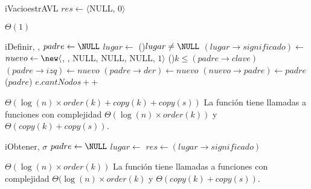 \begin{Algoritmos}


  \begin{algoritmo}{iVacio}{}{estrAVL}
    $res \gets \langle$NULL, 0$\rangle$ 
  \end{algoritmo}
  \datosAlgoritmo{} %
  {} %
  {} %
  {$\Theta(1)$} %
  {} %

  \begin{algoritmo}{iDefinir}{, , }{}
     $padre \gets \NULL$ 
     $lugar \gets$  
    \eIf(){$lugar \neq \NULL$}{
      $(lugar \to significado) \gets$  
    }{
       $nuevo \gets \new \langle$, , NULL, NULL, NULL, $1 \rangle$  
      \eIf(){$k \leq (padre \to clave)$}{
        $(padre \to izq) \gets nuevo$ 
      }{
        $(padre \to der) \gets nuevo$ 
      }
      $(nuevo \to padre) \gets padre$ 
      \rebalancear($padre$) 
      $e.cantNodos ++$ 
    }
  \end{algoritmo}
  \datosAlgoritmo{} %
  {} %
  {} %
  {$\Theta(\log(n) \times order(k) + copy(k) + copy(s))$} %
  {La funci\'on tiene llamadas a funciones con complejidad $\Theta(\log(n) \times order(k))$ y $\Theta(copy(k) + copy(s))$.} %

  \begin{algoritmo}{iObtener}{, }{$\sigma$}
     $padre \gets \NULL$ 
     $lugar \gets$  
    $res \gets (lugar \to significado)$ 
  \end{algoritmo}
  \datosAlgoritmo{} %
  {} %
  {} %
  {$\Theta(\log(n) \times order(k))$} %
  {La funci\'on tiene llamadas a funciones con complejidad $\Theta(\log(n) \times order(k)$ y $\Theta(copy(k) + copy(s))$.} %


\end{Algoritmos}
